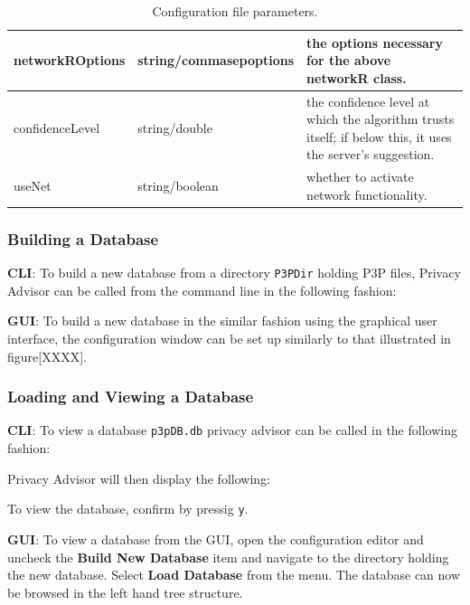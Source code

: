 \begin{center}
\begin{table}[h!]
\begin{tabular} { | l | l | p{7cm} | }
      networkROptions & string/commasepoptions	& the options necessary for the above networkR class. \\ \hline
      confidenceLevel & string/double & the confidence level at which the algorithm trusts itself; if below this, it uses the server's suggestion. \\ \hline
      useNet & string/boolean & whether to activate network functionality. \\ \hline
      \hline
    \end{tabular}
    \caption{Configuration file parameters.}
  \end{table}
\end{center}

\subsubsection{Building a Database}

\textbf{CLI}: To build a new database from a directory \texttt{P3PDir} holding P3P files, Privacy
Advisor can be called from the command line in the following fashion:


\textbf{GUI}: To build a new database in the similar fashion using the
graphical user interface, the configuration window can be set up
similarly to that illustrated in figure[XXXX].

\subsubsection{Loading and Viewing a Database}

\textbf{CLI}: To view a database \texttt{p3pDB.db} privacy advisor can be called in the following fashion:


Privacy Advisor will then display the following:


To view the database, confirm by pressig \texttt{y}.

\textbf{GUI}: To view a database from the GUI, open the configuration editor and uncheck the \textbf{Build New Database} item and 
navigate to the directory holding the new database. Select \textbf{Load Database} from the menu. The database can now be browsed in
the left hand tree structure.


